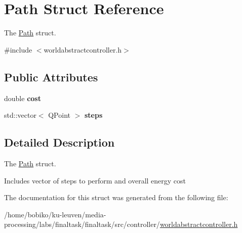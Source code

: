 \hypertarget{structPath}{}\section{Path Struct Reference}
\label{structPath}


The \hyperlink{structPath}{Path} struct.  




{\ttfamily \#include $<$worldabstractcontroller.\+h$>$}

\subsection*{Public Attributes}
\begin{DoxyCompactItemize}
\item 
double {\bfseries cost}\hypertarget{structPath_a4d54acc172b9690ba67bebec88c9d2c6}{}\label{structPath_a4d54acc172b9690ba67bebec88c9d2c6}

\item 
std\+::vector$<$ Q\+Point $>$ {\bfseries steps}\hypertarget{structPath_afbb63641e051bf96f7edf5e8abe3a842}{}\label{structPath_afbb63641e051bf96f7edf5e8abe3a842}

\end{DoxyCompactItemize}


\subsection{Detailed Description}
The \hyperlink{structPath}{Path} struct. 

Includes vector of steps to perform and overall energy cost 

The documentation for this struct was generated from the following file\+:\begin{DoxyCompactItemize}
\item 
/home/bobiko/ku-\/leuven/media-\/processing/labs/finaltask/finaltask/src/controller/\hyperlink{worldabstractcontroller_8h}{worldabstractcontroller.\+h}\end{DoxyCompactItemize}
